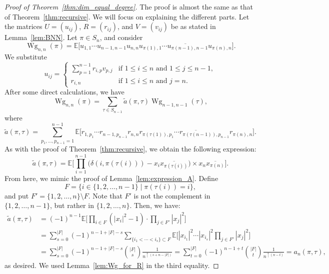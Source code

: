 \documentclass[pdftex]{sigma}
\numberwithin{equation}{section}
\theoremstyle{definition}
\DeclareMathOperator{\Wg}{Wg}
\begin{document}
\begin{proof}[Proof of Theorem~\ref{thm:dim_equal_degree}]
The proof is almost the same as that of Theorem~\ref{thm:recursive}.
We will focus on explaining the different parts.
Let the matrices $U=(u_{ij})$, $R=(r_{ij})$, and $V=(v_{ij})$ be as stated in Lemma~\ref{lem:BNN}.
Let $\pi \in S_n$, and consider
 \[
 \Wg_{n,n}(\pi) = \mathbb{E} \bigl[ u_{1,1} \cdots u_{n-1,n-1} u_{n,n}
 \overline{u_{\pi(1),1} \cdots u_{\pi(n-1),n-1} u_{\pi(n),n}} \bigr].
 \]
 We substitute
 \[
 u_{ij} =
 \begin{cases}
 \displaystyle \sum_{p=1}^{n-1} r_{i,p} v_{p,j} & \text{if $1 \le i \le n$ and $1 \le j \le n-1$}, \\
 r_{i,n} & \text{if $1 \le i \le n$ and $j=n$}.
 \end{cases}
 \]
 After some direct calculations, we have
 \[\Wg_{n,n}(\pi)= \sum_{\tau \in S_{n-1}} \tilde{a}(\pi,\tau) \Wg_{n-1,n-1}(\tau),
 \]
 where
 \[
 \tilde{a}(\pi,\tau)= \sum_{p_1,\dots,p_{n-1}=1}^{n-1} \mathbb{E}\bigl[ r_{1, p_1} \cdots r_{n-1, p_{n-1}} r_{n,n}
 \overline{r_{\pi (\tau(1)), p_1} \cdots r_{\pi (\tau(n-1)), p_{n-1}} r_{\pi(n),n}}
 \bigr].
 \]
 As with the proof of Theorem~\ref{thm:recursive}, we obtain the following expression:
 \[
 \tilde{a}(\pi,\tau)= \mathbb{E} \Biggl[\prod_{i=1}^{n-1}\bigl(\delta (i,\pi(\tau(i)))-x_{i} \overline{x_{\pi(\tau(i))}}\bigr) \times x_n \overline{x_{\pi(n)}} \Biggr].
 \]
 From here, we mimic the proof of Lemma~\ref{lem:expression_A}.
 Define
 \[
 F=\{i \in \{1,2,\dots,n-1\} \mid \pi(\tau(i))=i\},
 \]
 and put $F'=\{1,2,\dots,n\} \setminus F$.
 Note that $F'$ is not the complement in $\{1,2,\dots,n-1\}$, but rather in $\{1,2,\dots,n\}$.
 Then, we have:
 \begin{align*}
 \tilde{a}(\pi,\tau)
 &= (-1)^{n-1} \mathbb{E} \biggl[ \prod_{i \in F} (|x_i|^2-1) \cdot \prod_{j \in F'} |x_j|^2 \biggr] \\
 &= \sum_{s=0}^{|F|} (-1)^{n-1+|F|-s} \sum_{\{i_1< \cdots<i_s\} \subset F}
 \mathbb{E} \biggl[|x_{i_1}|^2 \cdots |x_{i_s}|^2 \prod_{j \in F'} |x_j|^2 \biggr] \\
 &= \sum_{s=0}^{|F|} (-1)^{n-1+|F|-s} \binom{|F|}{s} \frac{1}{n^{\uparrow (s+n-|F|)}} = \sum_{t=0}^{|F|} (-1)^{n-1+t} \binom{|F|}{t} \frac{1}{n^{\uparrow (n-t)}}
 =a_n(\pi, \tau),
 \end{align*}
 as desired. We used Lemma~\ref{lem:Wg_for_R} in the third equality.
\end{proof}
\end{document}
